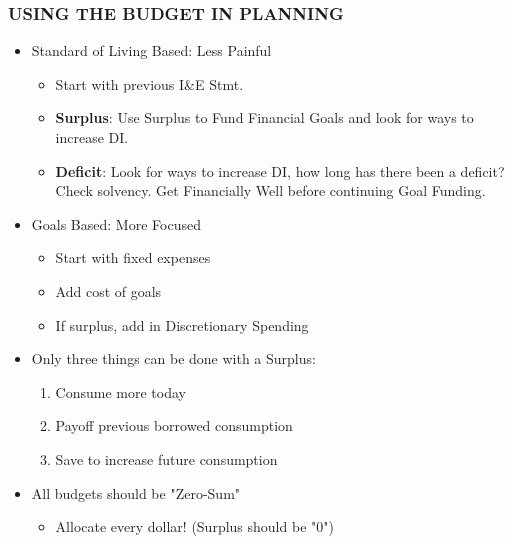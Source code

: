 \documentclass[12pt]{article}
\begin{document}
            \subsubsection{USING THE BUDGET IN PLANNING}
                \begin{itemize}
                    \item Standard of Living Based: Less Painful
                        \begin{itemize}
                            \item Start with previous I\&E Stmt.
                            \item \textbf{Surplus}: Use Surplus to Fund Financial Goals and look for ways to increase DI.
                            \item \textbf{Deficit}: Look for ways to increase DI, how long has there been a deficit?
                            Check solvency. Get Financially Well before continuing Goal Funding.
                        \end{itemize}
                    \item Goals Based: More Focused
                        \begin{itemize}
                            \item Start with fixed expenses
                            \item Add cost of goals
                            \item If surplus, add in Discretionary Spending
                        \end{itemize}
                    \item Only three things can be done with a Surplus:
                        \begin{enumerate}
                            \item Consume more today
                            \item Payoff previous borrowed consumption
                            \item Save to increase future consumption
                        \end{enumerate}
                    \item All budgets should be "Zero-Sum"
                        \begin{itemize}
                            \item Allocate every dollar! (Surplus should be "0")
                        \end{itemize}
                \end{itemize}
\end{document}
